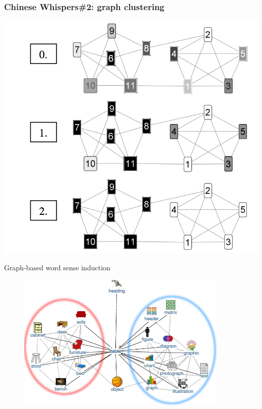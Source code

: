 \documentclass[usenames,dvipsnames]{beamer}
\begin{document}
\begin{frame}[fragile]
\frametitle{Chinese Whispers\#2: \alert{graph clustering}}
\begin{center}
 \includegraphics[height=0.59\textwidth]{figures/cw2}
 
 \end{center}
\end{frame}


\begin{frame}{Graph-based word sense induction}


	
\centering
\begin{figure}
\includegraphics[width=0.9\textwidth]{figures/table}
\end{figure}

\end{frame}
\end{document}
